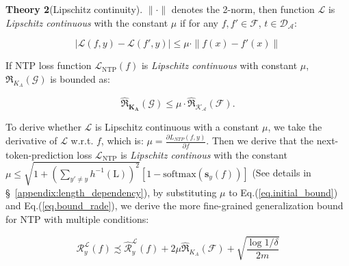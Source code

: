 \textbf{Theory 2}(Lipschitz continuity). $\|\cdot\|$ denotes the 2-norm, then function $\mathcal{L}$ is \textit{Lipschitz continuous} with the constant $\mu$ if for any $f, f' \in \mathcal{F}$, $t \in \mathcal{D_A}$:

\begin{small}
\begin{equation}
|\mathcal{L}(f, y) - \mathcal{L}(f', y)| \leq \mu \cdot \|f(x) - f'(x)\|
\end{equation}
\end{small}
If NTP loss function $\mathcal{L}_\mathrm{NTP}(f)$ is \textit{Lipschitz continuous} with constant $\mu$, $\Re_{K_A}(\mathcal{G})$ is bounded as:

\begin{small}
\begin{equation}
\label{eq.bound_rade}
\hat{{\Re}}_{\mathbf{K_A}}(\mathcal{G}) \le \mu \cdot \hat{{\Re}}_{\mathcal{K_A}}(\mathcal{F}).
\end{equation}
\end{small}
To derive whether $\mathcal{L}$ is Lipschitz continuous with a constant $\mu$, we take the derivative of $\mathcal{L}$ w.r.t. $f$, which is: $\mu=\frac{\partial L_{NTP}(f, y)}{\partial f}$.
Then we derive that the next-token-prediction loss $\mathcal{L}_\mathrm{NTP}$ is \textit{Lipschitz continous} with the constant $\mu\leq\sqrt{1 + \left( \sum_{y' \neq y} h^{-1}(\text{L}) \right)^2} \left[ 1 - \mathrm{softmax}\left( \boldsymbol{s}_y(f) \right) \right]$ (See details in \S~\ref{appendix:length_dependency}), by substituting $\mu$ to Eq.(\ref{eq.initial_bound}) and Eq.(\ref{eq.bound_rade}), we derive the more fine-grained generalization bound for NTP with multiple conditions:
\vspace{-0.5em}
\begin{small}
\begin{equation}
\label{eq.app_derive_bound}
\mathcal{R}^{\mathcal{L}}_y(f) \! \precsim \! \widehat{\mathcal{R}}^{\mathcal{L}}_y(f) \!+\! 2\mu\widehat{\Re}_{K_A}(\mathcal{F}) + \sqrt{\frac{\log 1/\delta}{2m}} 
\end{equation}
\end{small}
